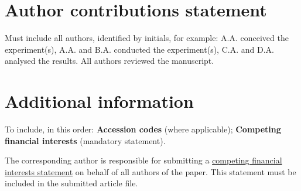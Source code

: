 \documentclass[fleqn,10pt]{wlscirep}
\begin{document}
\section*{Author contributions statement}

Must include all authors, identified by initials, for example:
A.A. conceived the experiment(s),  A.A. and B.A. conducted the experiment(s), C.A. and D.A. analysed the results.  All authors reviewed the manuscript.

\section*{Additional information}

To include, in this order: \textbf{Accession codes} (where applicable); \textbf{Competing financial interests} (mandatory statement).

The corresponding author is responsible for submitting a \href{http://www.nature.com/srep/policies/index.html#competing}{competing financial interests statement} on behalf of all authors of the paper. This statement must be included in the submitted article file.
\end{document}

